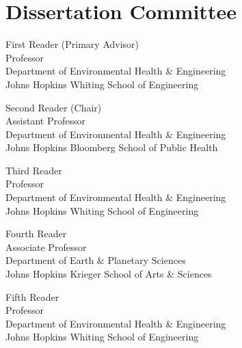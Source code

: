 \chapter*{Dissertation Committee}

\begin{singlespace}

\noindent First Reader (Primary Advisor)\\
\indent Professor\\
\indent Department of Environmental Health \& Engineering\\
\indent Johns Hopkins Whiting School of Engineering\\
\medskip

\noindent Second Reader (Chair) \\
\indent Assistant Professor\\
\indent Department of Environmental Health \& Engineering\\
\indent Johns Hopkins Bloomberg School of Public Health\\
\medskip

\noindent Third Reader\\
\indent Professor \\
\indent Department of Environmental Health \& Engineering\\
\indent Johns Hopkins Whiting School of Engineering\\
\medskip

\noindent Fourth Reader\\
\indent Associate Professor\\
\indent Department of Earth \& Planetary Sciences\\
\indent Johns Hopkins Krieger School of Arts \& Sciences\\
\medskip

\noindent Fifth Reader\\
\indent Professor\\
\indent Department of Environmental Health \& Engineering\\
\indent Johns Hopkins Whiting School of Engineering\\
\medskip 

\end{singlespace}

\newpage 
